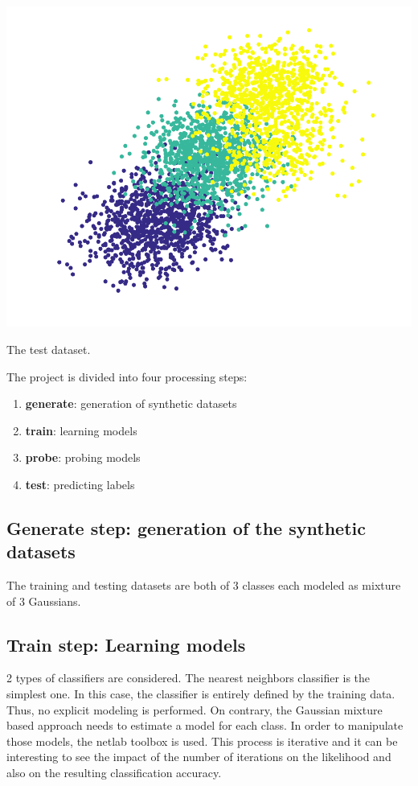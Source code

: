 \documentclass[12pt,a4paper,fleqn]{tufte-handout}
\begin{document}
\begin{marginfigure}
\includegraphics[width=\textwidth]{figures/scatter2}
\caption{The test dataset.}
\label{test}
\end{marginfigure}

The project is divided into four processing steps:
\begin{enumerate}
\item \textbf{generate}: generation of synthetic datasets
\item \textbf{train}: learning models
\item \textbf{probe}: probing models
\item \textbf{test}: predicting labels
\end{enumerate}

\subsection{\textbf{Generate step}: generation of the synthetic datasets}

The training and testing datasets are both of 3 classes each modeled as mixture of 3 Gaussians. 

\subsection{\textbf{Train step}: Learning models}

2 types of classifiers are considered. The nearest neighbors classifier is the simplest one. In this case, the classifier is entirely defined by the training data. Thus, no explicit modeling is performed. On contrary, the Gaussian mixture based approach needs to estimate a model for each class. In order to manipulate those models, the netlab toolbox is used. This process is iterative and it can be interesting to see the impact of the number of iterations on the likelihood and also on the resulting classification accuracy.
\end{document}
